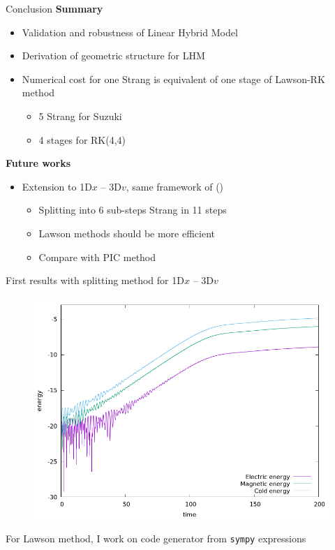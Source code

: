 \documentclass{beamer}
\newcommand{\arrow}{{\color{PLB}\ding{220}}}
\newcommand{\mbold}[1]{{\textbf{\color{PLB}#1}}}
\newcommand{\customcite}[1]{\citeauthor{#1} (\citeyear{#1})}
\begin{document}
\begin{frame}{Conclusion}
  \mbold{Summary}
  \begin{itemize}
    \item Validation and robustness of Linear Hybrid Model
    \item Derivation of geometric structure for LHM
    \item Numerical cost for one Strang is equivalent of one stage of Lawson-RK method \begin{itemize}
        \item 5 Strang for Suzuki
        \item 4 stages for RK(4,4)
      \end{itemize}
  \end{itemize}

  \mbold{Future works}
  \begin{itemize}
    \item Extension to 1D$x$ -- 3D$v$, same framework of {\color{PLB}\customcite{Holderied:2020}}\begin{itemize}
      \item Splitting into 6 sub-steps \arrow Strang in 11 steps
      \item Lawson methods should be more efficient
      \item Compare with PIC method
    \end{itemize}
  \end{itemize}
\end{frame}

\begin{frame}[t]
  First results with splitting method for 1D$x$ -- 3D$v$
  \begin{figure}\centering
    \includegraphics[height=0.8\textheight]{img/energy3dv.png}
  \end{figure}
  For Lawson method, I work on code generator from \texttt{sympy} expressions
\end{frame}
\end{document}
